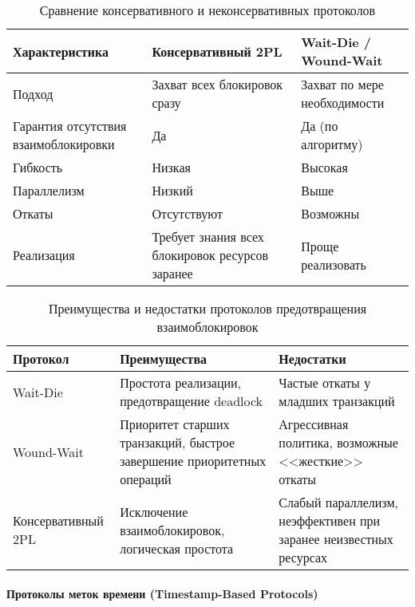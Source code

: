  \begin{table}[H]
     \centering
     \caption{Сравнение консервативного и неконсервативных протоколов}
     \begin{tabular}{|p{5cm}|p{5cm}|p{5cm}|}
         \hline
         \textbf{Характеристика} & \textbf{Консервативный 2PL} & \textbf{Wait-Die / Wound-Wait} \\
         \hline
         Подход & Захват всех блокировок сразу & Захват по мере необходимости \\
         \hline
         Гарантия отсутствия взаимоблокировки & Да & Да (по алгоритму) \\
         \hline
         Гибкость & Низкая & Высокая \\
         \hline
         Параллелизм & Низкий & Выше \\
         \hline
         Откаты & Отсутствуют & Возможны \\
         \hline
         Реализация & Требует знания всех блокировок ресурсов заранее & Проще реализовать \\
         \hline
     \end{tabular}
 \end{table}
     
 \begin{table}[H]
     \centering
     \caption{Преимущества и недостатки протоколов предотвращения взаимоблокировок}
     \begin{tabular}{|l|p{6cm}|p{6cm}|}
         \hline
         \textbf{Протокол} & \textbf{Преимущества} & \textbf{Недостатки} \\
         \hline
         Wait-Die & Простота реализации, предотвращение deadlock & Частые откаты у младших транзакций \\
         \hline
         Wound-Wait & Приоритет старших транзакций, быстрое завершение приоритетных операций & Агрессивная политика, возможные <<жесткие>> откаты \\
         \hline
         Консервативный 2PL & Исключение взаимоблокировок, логическая простота & Слабый параллелизм, неэффективен при заранее неизвестных ресурсах \\
         \hline
     \end{tabular}
 \end{table}
    
\paragraph{Протоколы меток времени (Timestamp-Based Protocols)} ~\\

